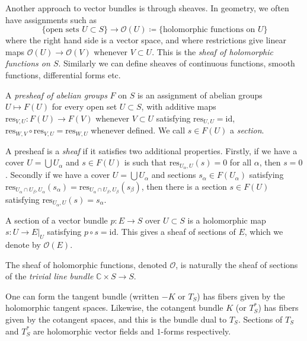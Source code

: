 Another approach to vector bundles is through sheaves. In geometry, we often
have assignments such as
\[
    \{\text{open sets }U\subset S\}\to \mathscr{O}(U)\coloneq \{\text{holomorphic functions on }U\}
\]
where the right hand side is a vector space, and where restrictions give linear
maps \(\mathscr{O}(U)\to \mathscr{O}(V)\) whenever \(V\subset U\). This is the
\textit{sheaf of holomorphic functions on \(S\)}. Similarly we can define
sheaves of continuous functions, smooth functions, differential forms etc.

\begin{definition}
    A \textit{presheaf of abelian groups} \(F\) on \(S\) is an assignment of
    abelian groups \(U\mapsto F(U)\) for every open set \(U\subset S\), with
    additive maps \(\text{res}_{V,U}:F(U)\to F(V)\) whenever \(V\subset U\)
    satisfying \(\text{res}_{U,U}=\text{id}\), \(\text{res}_{W,V}\circ
    \text{res}_{V,U}=\text{res}_{W,U}\) whenever defined. We call \(s\in F(U)\)
    a \textit{section}.

    A presheaf is a \textit{sheaf} if it satisfies two additional properties.
    Firstly, if we have a cover \(U=\bigcup U_\alpha\) and \(s\in F(U)\) is such
    that \(\text{res}_{U_\alpha,U}(s)=0\) for all \(\alpha\), then \(s=0\).
    Secondly if we have a cover \(U=\bigcup U_\alpha\) and sections
    \(s_\alpha\in F(U_\alpha)\) satisfying \(\text{res}_{U_\alpha\cap U_\beta,
    U_\alpha}(s_\alpha) = \text{res}_{U_\alpha\cap U_\beta, U_\beta}(s_\beta)\),
    then there is a section \(s\in F(U)\) satisfying
    \(\text{res}_{U_\alpha,U}(s)=s_\alpha\).
\end{definition}

\begin{example}
    A section of a vector bundle \(p:E\to S\) over \(U\subset S\) is a
    holomorphic map \(s:U\to E|_U\) satisfying \(p\circ s =\text{id}\). This
    gives a sheaf of sections of \(E\), which we denote by \(\mathscr{O}(E)\).

    The sheaf of holomorphic functions, denoted \(\mathscr{O}\), is naturally
    the sheaf of sections of the \textit{trivial line bundle}
    \(\mathbb{C}\times S\to S\).
\end{example}

\begin{example}
    One can form the tangent bundle (written \(-K\) or \(T_S\)) has fibers given
    by the holomorphic tangent spaces. Likewise, the cotangent bundle \(K\) (or
    \(T^\ast_S\)) has fibers given by the cotangent spaces, and this is the
    bundle dual to \(T_S\). Sections of \(T_S\) and \(T^\ast_S\) are holomorphic
    vector fields and \(1\)-forms respectively.
\end{example}


